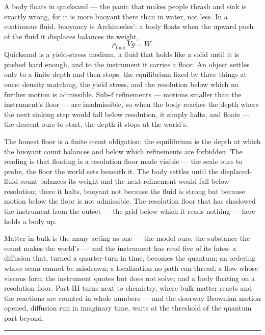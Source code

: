 A body floats in quicksand --- the panic that makes people thrash and sink is exactly wrong, for it is
more buoyant there than in water, not less. In a continuous fluid, buoyancy is Archimedes': a body
floats when the upward push of the fluid it displaces balances its weight,
\begin{equation}
  \rho_{\text{fluid}}\,V g = W .
\end{equation}
Quicksand is a yield-stress medium, a fluid that holds like a solid until it is pushed hard enough, and to the
instrument it carries a floor. An object settles only to a finite depth and then stops, the equilibrium fixed
by three things at once: density matching, the yield stress, and the resolution below which no further motion
is admissible. Sub-$\delta$ refinements --- motions smaller than the instrument's floor --- are inadmissible,
so when the body reaches the depth where the next sinking step would fall below resolution, it simply halts,
and floats --- the descent ours to start, the depth it stops at the world's.

The honest floor is a finite count obligation: the equilibrium is the depth at which the buoyant count
balances and below which refinements are forbidden. The reading is that floating is a resolution floor made
visible --- the scale ours to probe, the floor the world sets beneath it. The body settles until the
displaced-fluid count balances its weight and the next refinement would fall below resolution; there it halts, buoyant not because the fluid is strong but because motion below the
floor is not admissible. The resolution floor that has shadowed the instrument from the outset --- the
grid below which it reads nothing --- here holds a body up.

\bigskip

Matter in bulk is the many acting as one --- the model ours, the substance the count makes the world's --- and
the instrument has read five of its fates: a diffusion that,
turned a quarter-turn in time, becomes the quantum; an ordering whose seam cannot be misdrawn; a localization
no path can thread; a flow whose viscous form the instrument quotes but does not solve; and a body floating on
a resolution floor. Part III turns next to chemistry, where bulk matter reacts and the reactions are counted
in whole numbers --- and the doorway Brownian motion opened, diffusion run in imaginary time, waits at the
threshold of the quantum part beyond.

\bigskip
\begin{center}
\rule{0.4\textwidth}{0.4pt}
\end{center}
\bigskip


